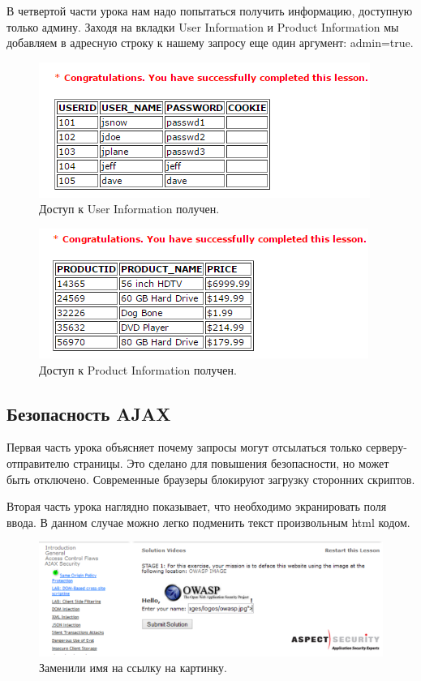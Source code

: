 \documentclass[a4paper, 14pt]{article}				%
\begin{document}
В четвертой части урока нам надо попытаться получить информацию, доступную только админу. Заходя на вкладки User Information и Product Information мы добавляем в адресную строку к нашему запросу еще один аргумент: admin=true.

\begin{figure}[h!]
\centering
\includegraphics[width=\textwidth]{rsrc/3_1}
\caption{Доступ к User Information получен.}
\end{figure}

\begin{figure}[h!]
\centering
\includegraphics[width=\textwidth]{rsrc/3_2}
\caption{Доступ к Product Information получен.}
\end{figure}

\newpage
\subsection{Безопасность AJAX}
Первая часть урока объясняет почему запросы могут отсылаться только серверу-отправителю страницы. Это сделано для повышения безопасности, но может быть отключено. Современные браузеры блокируют загрузку сторонних скриптов. 

Вторая часть урока наглядно показывает, что необходимо экранировать поля ввода. В данном случае можно легко подменить текст произвольным html кодом.
\begin{figure}[h!]
\centering
\includegraphics[width=\textwidth]{rsrc/4_1}
\caption{Заменили имя на ссылку на картинку.}
\end{figure}
\end{document}
